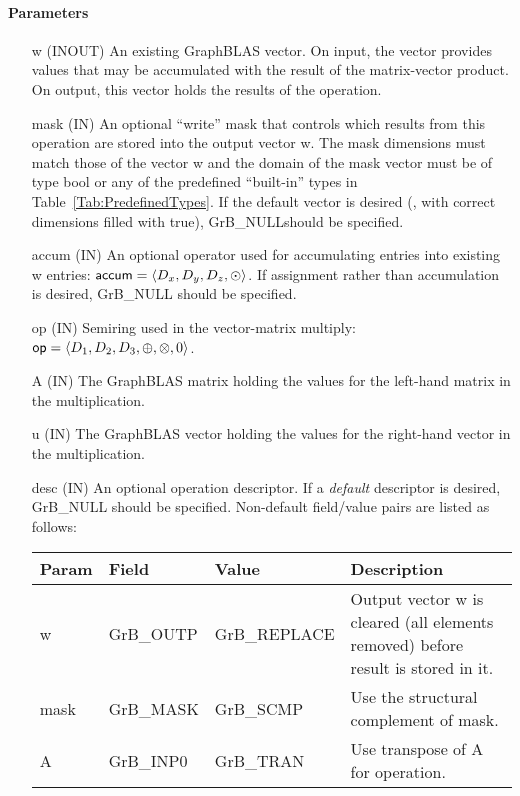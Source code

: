 \paragraph{Parameters}

\begin{itemize}[leftmargin=1.1in]
    \item[{\sf w}]    ({\sf INOUT}) An existing GraphBLAS vector.  On input, the
    vector provides values that may be accumulated with the result of the
    matrix-vector product.  On output, this vector holds the results of the
    operation.

    \item[{\sf mask}] ({\sf IN}) An optional ``write'' mask that controls which
    results from this operation are stored into the output vector {\sf w}. The 
    mask dimensions must match those of the vector {\sf w} and the domain of the
    {\sf mask} vector must be of type {\sf bool} or any of the predefined 
    ``built-in'' types in Table~\ref{Tab:PredefinedTypes}.  If the default vector
    is desired (\ie, with correct dimensions filled with {\sf true}), 
    {\sf GrB\_NULL}should be specified.

	\item[{\sf accum}]  ({\sf IN}) An optional operator used for accumulating
    entries into existing {\sf w} entries: ${\sf accum} = \langle D_x,
    D_y, D_z,\odot \rangle$. If assignment rather than accumulation is
    desired, {\sf GrB\_NULL} should be specified.

    \item[{\sf op}]   ({\sf IN}) Semiring used in the vector-matrix
    multiply: ${\sf op}=\langle D_1,D_2,D_3,\oplus,\otimes,0 \rangle$.
    
    \item[{\sf A}]    ({\sf IN}) The GraphBLAS matrix holding the values
    for the left-hand matrix in the multiplication.
    
    \item[{\sf u}]    ({\sf IN}) The GraphBLAS vector holding the values for
    the right-hand vector in the multiplication.

    \item[{\sf desc}] ({\sf IN}) An optional operation descriptor. If
    a \emph{default} descriptor is desired, {\sf GrB\_NULL} should be
    specified. Non-default field/value pairs are listed as follows:  \\

    \begin{tabular}{lllp{2.5in}}
    Param & Field  & Value & Description \\
    \hline
    {\sf w}    & {\sf GrB\_OUTP} & {\sf GrB\_REPLACE} & Output vector {\sf w} is cleared (all elements removed) before result is stored in it.\\
    {\sf mask} & {\sf GrB\_MASK} & {\sf GrB\_SCMP}   & Use the structural complement of {\sf mask}. \\
    {\sf A}    & {\sf GrB\_INP0} & {\sf GrB\_TRAN}   & Use transpose of {\sf A} for operation. \\
    \end{tabular}
\end{itemize}

